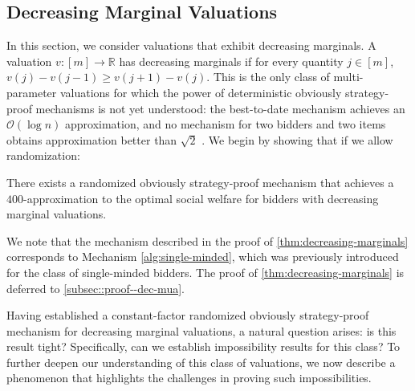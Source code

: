 \subsection{Decreasing Marginal Valuations}\label{subsec::mua-decreasing}
In this section, we consider valuations that exhibit decreasing marginals. 
A valuation $v:[m]\to \mathbb R$  has decreasing marginals if  for every quantity $j\in [m]$, $v(j)-v(j-1)\ge v(j+1)-v(j)$. 
This is the only class of multi-parameter valuations for which the power of deterministic obviously strategy-proof mechanisms is not yet understood: 
the best-to-date mechanism achieves an $\mathcal O(\log n)$ approximation, and no mechanism for two bidders and two items obtains approximation better than $\sqrt 2$ \cite{GMR17}. We begin by showing that if we allow randomization:
\begin{theorem}\label{thm:decreasing-marginals}
There exists a randomized obviously strategy-proof mechanism that achieves a $400$\allowbreak-approximation to the optimal social welfare for bidders with decreasing marginal valuations.
\end{theorem}
We note that the mechanism described in the proof of \cref{thm:decreasing-marginals} corresponds to Mechanism \ref{alg:single-minded}, which was previously introduced for the class of single-minded bidders. The proof of \cref{thm:decreasing-marginals} is deferred to \cref{subsec::proof--dec-mua}.

Having established a constant-factor randomized obviously strategy-proof mechanism for decreasing marginal valuations, a natural question arises: is this result tight? Specifically, can we establish impossibility results for this class? To further deepen our understanding of this class of valuations, we now describe a phenomenon that highlights the challenges in proving such impossibilities.

